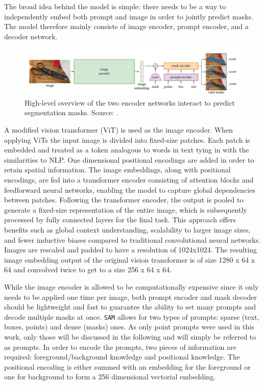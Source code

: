 The broad idea behind the model is simple: there needs to be a way to independently embed both prompt and image in order to jointly predict masks. The model therefore mainly consists of image encoder, prompt encoder, and a decoder network.
\begin{figure}
	\centering
	\includegraphics[width=\textwidth]{"images/sam_overview.png"}
	\caption[\texttt{SAM} Overview]{High-level overview of the two encoder networks interact to predict segmentation masks. Source: \cite{kirillov2023segment}.}
	\label{figsamoverview}
\end{figure}
A modified vision transformer \cite{dosovitskiy2020image} (ViT) is used as the image encoder. When applying ViTs the input image is divided into fixed-size patches. Each patch is embedded and treated as a token analogous to words in text tying in with the similarities to NLP. One dimensional positional encodings are added in order to retain spatial information. The image embeddings, along with positional encodings, are fed into a transformer encoder \cite{vaswani2017attention} consisting of attention blocks and feedforward neural networks, enabling the model to capture global dependencies between patches. Following the transformer encoder, the output is pooled to generate a fixed-size representation of the entire image, which is subsequently processed by fully connected layers for the final task. This approach offers benefits such as global context understanding, scalability to larger image sizes, and fewer inductive biases compared to traditional convolutional neural networks. Images are rescaled and padded to have a resolution of 1024x1024. The resulting image embedding output of the original vision transformer is of size 1280 x 64 x 64 and convolved twice to get to a size 256 x 64 x 64. 

While the image encoder is allowed to be computationally expensive since it only needs to be applied one time per image, both prompt encoder and mask decoder should be lightweight and fast to guarantee the ability to set many prompts and decode multiple masks at once. \texttt{SAM} allows for two types of prompts: sparse (text, boxes, points) and dense (masks) ones. As only point prompts were used in this work, only those will be discussed in the following and will simply be referred to as prompts. In order to encode the prompts, two pieces of information are required: foreground/background knowledge and positional knowledge. The positional encoding is either summed with an embedding for the foreground or one for background to form a 256 dimensional vectorial embedding.

